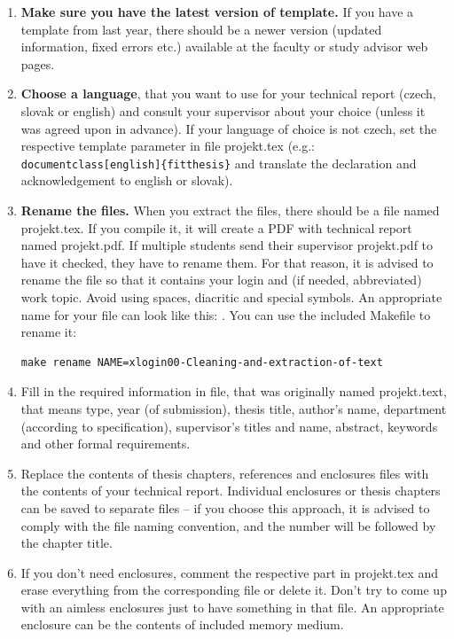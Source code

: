 \begin{enumerate}
  \item \textbf{Make sure you have the latest version of template.} If you have a template from last year, there should be a newer version (updated information, fixed errors etc.) available at the faculty or study advisor web pages.  
  \item \textbf{Choose a language}, that you want to use for your technical report (czech, slovak or english) and consult your supervisor about your choice (unless it was agreed upon in advance). If your language of choice is not czech, set the respective template parameter in file projekt.tex (e.g.: \verb|documentclass[english]{fitthesis}| and translate the declaration and acknowledgement to english or slovak).
  \item \textbf{Rename the files.} When you extract the files, there should be a file named projekt.tex. If you compile it, it will create a PDF with technical report named projekt.pdf. If multiple students send their supervisor projekt.pdf to have it checked, they have to rename them. For that reason, it is advised to rename the file so that it contains your login and (if needed, abbreviated) work topic. Avoid using spaces, diacritic and special symbols. An appropriate name for your file can look like this: . You can use the included Makefile to rename it: 
\begin{verbatim}
make rename NAME=xlogin00-Cleaning-and-extraction-of-text
\end{verbatim}
  \item Fill in the required information in file, that was originally named projekt.text, that means type, year (of submission), thesis title, author's name, department (according to specification), supervisor's titles and name, abstract, keywords and other formal requirements.
  \item Replace the contents of thesis chapters, references and enclosures files with the contents of your technical report. Individual enclosures or thesis chapters can be saved to separate files -- if you choose this approach, it is advised to comply with the file naming convention, and the number will be followed by the chapter title.
  \item If you don't need enclosures, comment the respective part in projekt.tex and erase everything from the corresponding file or delete it. Don't try to come up with an aimless enclosures just to have something in that file. An appropriate enclosure can be the contents of included memory medium.

\end{enumerate}
